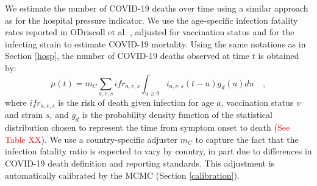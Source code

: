 We estimate the number of COVID-19 deaths over time using a similar approach 
as for the hospital pressure indicator. We use the age-specific infection fatality rates reported in
ODriscoll et al. \cite{odriscoll-2021}, adjusted for vaccination status and for the infecting strain
to estimate COVID-19 mortality. Using the same notations as in Section \ref{hosp}, the number of COVID-19
deaths observed at time $t$ is obtained by:
\begin{equation}
\mu(t) = m_C \sum_{a,v,s} ifr_{a,v,s} \int_{u \geq 0}  i_{a,v,s}(t-u)g_{d}(u) du   \quad,
\end{equation}
where $ifr_{a,v,s}$ is the risk of death given infection for age $a$, vaccination status $v$ and strain $s$, 
and $g_d$ is the probability density function of the statistical distribution chosen to represent the 
time from symptom onset to death (\textcolor{red}{See Table XX}). We use a country-specific adjuster $m_C$ to 
capture the fact that the infection fatality ratio is expected to vary by country, in part due to 
differences in COVID-19 death definition and reporting standards. This adjustment is automatically calibrated 
by the MCMC (Section \ref{calibration}).